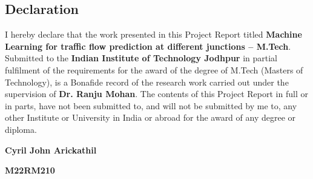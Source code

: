 
\begin{titlepage}
    \begin{flushright}
        
  
\section*{Declaration}
\justifying
I hereby declare that the work presented in this Project Report titled \textbf{ Machine Learning for traffic flow prediction at different junctions – M.Tech}. Submitted to the \textbf{ Indian Institute of Technology Jodhpur} in partial fulfilment of the requirements for the award of the degree of M.Tech (Masters of Technology), is a Bonafide record of the research work carried out under the supervision of \textbf{ Dr. Ranju Mohan}. The contents of this Project Report in full or in parts, have not been submitted to, and will not be submitted by me to, any other Institute or University in India or abroad for the award of any degree or diploma.
\vspace*{3\baselineskip}


{\large  \bfseries Cyril John Arickathil }

{\large  \bfseries  M22RM210 }


\end{flushright}

\end{titlepage}
